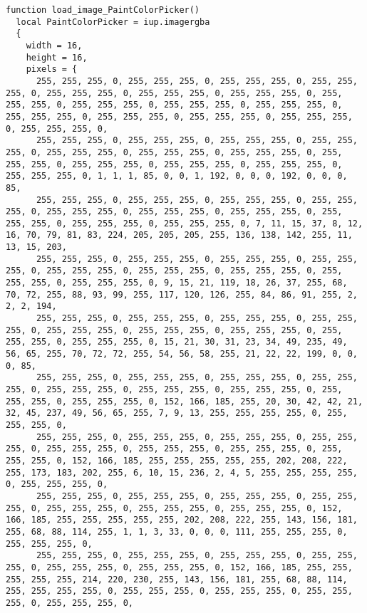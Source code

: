 \documentclass{ctexart}
\begin{document}
\begin{lstlisting}
function load_image_PaintColorPicker()
  local PaintColorPicker = iup.imagergba
  {
    width = 16,
    height = 16,
    pixels = {
      255, 255, 255, 0, 255, 255, 255, 0, 255, 255, 255, 0, 255, 255, 255, 0, 255, 255, 255, 0, 255, 255, 255, 0, 255, 255, 255, 0, 255, 255, 255, 0, 255, 255, 255, 0, 255, 255, 255, 0, 255, 255, 255, 0, 255, 255, 255, 0, 255, 255, 255, 0, 255, 255, 255, 0, 255, 255, 255, 0, 255, 255, 255, 0, 
      255, 255, 255, 0, 255, 255, 255, 0, 255, 255, 255, 0, 255, 255, 255, 0, 255, 255, 255, 0, 255, 255, 255, 0, 255, 255, 255, 0, 255, 255, 255, 0, 255, 255, 255, 0, 255, 255, 255, 0, 255, 255, 255, 0, 255, 255, 255, 0, 1, 1, 1, 85, 0, 0, 1, 192, 0, 0, 0, 192, 0, 0, 0, 85, 
      255, 255, 255, 0, 255, 255, 255, 0, 255, 255, 255, 0, 255, 255, 255, 0, 255, 255, 255, 0, 255, 255, 255, 0, 255, 255, 255, 0, 255, 255, 255, 0, 255, 255, 255, 0, 255, 255, 255, 0, 7, 11, 15, 37, 8, 12, 16, 70, 79, 81, 83, 224, 205, 205, 205, 255, 136, 138, 142, 255, 11, 13, 15, 203, 
      255, 255, 255, 0, 255, 255, 255, 0, 255, 255, 255, 0, 255, 255, 255, 0, 255, 255, 255, 0, 255, 255, 255, 0, 255, 255, 255, 0, 255, 255, 255, 0, 255, 255, 255, 0, 9, 15, 21, 119, 18, 26, 37, 255, 68, 70, 72, 255, 88, 93, 99, 255, 117, 120, 126, 255, 84, 86, 91, 255, 2, 2, 2, 194, 
      255, 255, 255, 0, 255, 255, 255, 0, 255, 255, 255, 0, 255, 255, 255, 0, 255, 255, 255, 0, 255, 255, 255, 0, 255, 255, 255, 0, 255, 255, 255, 0, 255, 255, 255, 0, 15, 21, 30, 31, 23, 34, 49, 235, 49, 56, 65, 255, 70, 72, 72, 255, 54, 56, 58, 255, 21, 22, 22, 199, 0, 0, 0, 85, 
      255, 255, 255, 0, 255, 255, 255, 0, 255, 255, 255, 0, 255, 255, 255, 0, 255, 255, 255, 0, 255, 255, 255, 0, 255, 255, 255, 0, 255, 255, 255, 0, 255, 255, 255, 0, 152, 166, 185, 255, 20, 30, 42, 42, 21, 32, 45, 237, 49, 56, 65, 255, 7, 9, 13, 255, 255, 255, 255, 0, 255, 255, 255, 0, 
      255, 255, 255, 0, 255, 255, 255, 0, 255, 255, 255, 0, 255, 255, 255, 0, 255, 255, 255, 0, 255, 255, 255, 0, 255, 255, 255, 0, 255, 255, 255, 0, 152, 166, 185, 255, 255, 255, 255, 255, 202, 208, 222, 255, 173, 183, 202, 255, 6, 10, 15, 236, 2, 4, 5, 255, 255, 255, 255, 0, 255, 255, 255, 0, 
      255, 255, 255, 0, 255, 255, 255, 0, 255, 255, 255, 0, 255, 255, 255, 0, 255, 255, 255, 0, 255, 255, 255, 0, 255, 255, 255, 0, 152, 166, 185, 255, 255, 255, 255, 255, 202, 208, 222, 255, 143, 156, 181, 255, 68, 88, 114, 255, 1, 1, 3, 33, 0, 0, 0, 111, 255, 255, 255, 0, 255, 255, 255, 0, 
      255, 255, 255, 0, 255, 255, 255, 0, 255, 255, 255, 0, 255, 255, 255, 0, 255, 255, 255, 0, 255, 255, 255, 0, 152, 166, 185, 255, 255, 255, 255, 255, 214, 220, 230, 255, 143, 156, 181, 255, 68, 88, 114, 255, 255, 255, 255, 0, 255, 255, 255, 0, 255, 255, 255, 0, 255, 255, 255, 0, 255, 255, 255, 0, 

\end{lstlisting}
\end{document}
